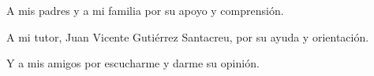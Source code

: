 
A mis padres y a mi familia por su apoyo y comprensión.
\par
A mi tutor, Juan Vicente Gutiérrez Santacreu, por su ayuda y orientación.
\par
Y a mis amigos por escucharme y darme su opinión.